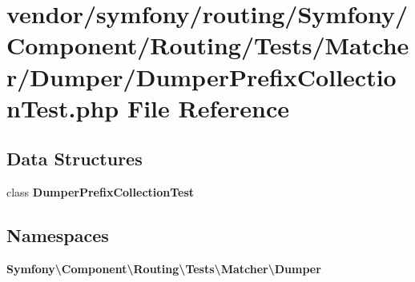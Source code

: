 \section{vendor/symfony/routing/\+Symfony/\+Component/\+Routing/\+Tests/\+Matcher/\+Dumper/\+Dumper\+Prefix\+Collection\+Test.php File Reference}
\label{_dumper_prefix_collection_test_8php}
\subsection*{Data Structures}
\begin{DoxyCompactItemize}
\item 
class {\bf Dumper\+Prefix\+Collection\+Test}
\end{DoxyCompactItemize}
\subsection*{Namespaces}
\begin{DoxyCompactItemize}
\item 
 {\bf Symfony\textbackslash{}\+Component\textbackslash{}\+Routing\textbackslash{}\+Tests\textbackslash{}\+Matcher\textbackslash{}\+Dumper}
\end{DoxyCompactItemize}
